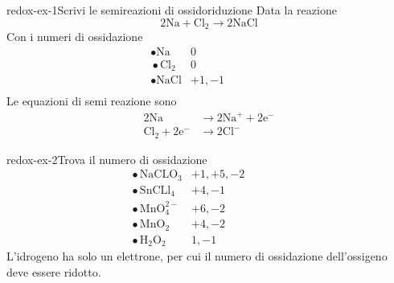 \documentclass[preview]{standalone}
\begin{document}
\genpage

\begin{snippetexercise}{redox-ex-1}{Scrivi le semireazioni di ossidoriduzione}
    Data la reazione
    \[
        2\text{Na} + \text{Cl}_2 \rightarrow 2\text{NaCl}
    \]
    Con i numeri di ossidazione
    \begin{align*}
        &\,\bullet \text{Na} & 0 &&&&&&\\
        &\,\bullet \text{Cl}_2 & 0 &&&&&&\\
        &\,\bullet \text{NaCl} & +1, -1 &&&&&&\\
    \end{align*}
    Le equazioni di semi reazione sono
    \begin{align*}
        2\text{Na} &\rightarrow 2\text{Na}^+ + 2\text{e}^- \\
        \text{Cl}_2 + 2\text{e}^- &\rightarrow 2\text{Cl}^-
    \end{align*}
\end{snippetexercise}

\begin{snippetexercise}{redox-ex-2}{Trova il numero di ossidazione}
    \begin{align*}
        &\,\bullet \text{NaCLO}_3 & +1, +5, -2 &&&&&&\\
        &\,\bullet \text{SnCLl}_4 & +4, -1 &&&&&&\\
        &\,\bullet \text{MnO}_4^{2-} & +6, -2 &&&&&&\\
        &\,\bullet \text{MnO}_2 & +4, -2 &&&&&&\\
        &\,\bullet \text{H}_2\text{O}_2 & 1, -1&&&&&&
    \end{align*}
    L'idrogeno ha solo un elettrone, per cui il numero di ossidazione dell'ossigeno deve essere
    ridotto.
\end{snippetexercise}
\end{document}
